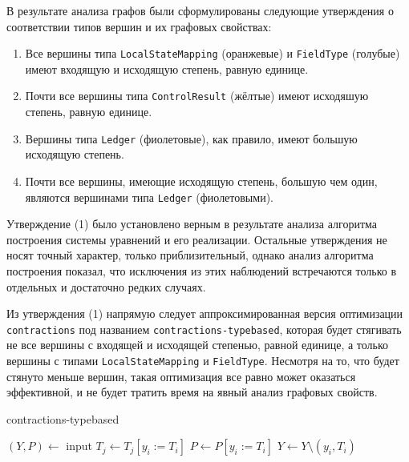 \documentclass[../thesis.tex]{subfiles}
\begin{document}
В результате анализа графов были сформулированы следующие утверждения о соответствии типов вершин и их графовых свойствах:

\begin{enumerate}
    \item Все вершины типа \texttt{LocalStateMapping} (оранжевые) и \texttt{FieldType} (голубые) имеют входящую и исходящую степень, равную единице.
    \item Почти все вершины типа \texttt{ControlResult} (жёлтые) имеют исходяшую степень, равную единице.
    \item Вершины типа \texttt{Ledger} (фиолетовые), как правило, имеют большую исходящую степень.
    \item Почти все вершины, имеющие исходящую степень, большую чем один, являются вершинами типа \texttt{Ledger} (фиолетовыми).
\end{enumerate}

Утверждение (1) было установлено верным в результате анализа алгоритма построения системы уравнений и его реализации. Остальные утверждения не носят точный характер, только приблизительный, однако анализ алгоритма построения показал, что исключения из этих наблюдений встречаются только в отдельных и достаточно редких случаях.

Из утверждения (1) напрямую следует аппроксимированная версия оптимизации \texttt{contractions} под названием \texttt{contractions-typebased}, которая будет стягивать не все вершины с входящей и исходящей степенью, равной единице, а только вершины с типами \texttt{LocalStateMapping} и \texttt{FieldType}. Несмотря на то, что будет стянуто меньше вершин, такая оптимизация все равно может оказаться эффективной, и не будет тратить время на явный анализ графовых свойств.

\begin{megaalgorithm}
    \caption{contractions-typebased}
  \begin{algorithmic}
    \State $(Y, P)\gets$ input
        \If{\textcolor{red}{$typeof(y_i)$ is $LocalStateMapping$ or $FieldType$}}
                \State $T_j \gets T_j [y_i := T_i]$
            \EndFor
            \State $P \gets P [y_i := T_i]$
            \State $Y\gets Y \setminus (y_i, T_i)$
        \EndIf
    \EndFor
    \State {}
  \end{algorithmic}
\end{megaalgorithm} 
\end{document}
